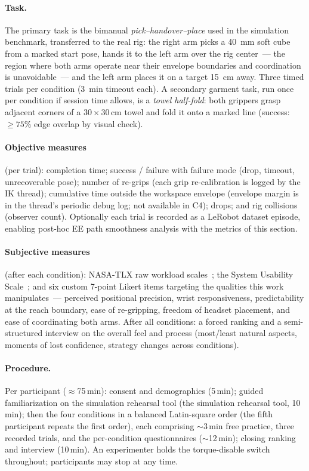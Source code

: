 \paragraph{Task.}
The primary task is the bimanual \emph{pick--handover--place} used in the
simulation benchmark, transferred to the real rig: the right arm picks a
\SI{40}{mm} soft cube from a marked start pose, hands it to the left arm
over the rig center~--- the region where both arms operate near their
envelope boundaries and coordination is unavoidable~--- and the left arm
places it on a target \SI{15}{cm} away. Three timed trials per condition
(\SI{3}{min} timeout each). A secondary garment task, run once per
condition if session time allows, is a \emph{towel half-fold}: both
grippers grasp adjacent corners of a \(30\times30\)\,cm towel and fold it
onto a marked line (success: \(\ge75\%\) edge overlap by visual check).

\paragraph{Objective measures} (per trial): completion time; success /
failure with failure mode (drop, timeout, unrecoverable pose); number of
re-grips (each grip re-calibration is logged by the IK thread); cumulative
time outside the workspace envelope (envelope margin is in the thread's
periodic debug log; not available in C4); drops; and rig collisions
(observer count). Optionally each trial is recorded as a LeRobot dataset
episode, enabling post-hoc EE path smoothness analysis with the metrics of
this section.

\paragraph{Subjective measures} (after each condition): NASA-TLX raw
workload scales~\citep{nasatlx}; the System Usability
Scale~\citep{sus}; and six custom 7-point Likert items targeting the
qualities this work manipulates~--- perceived positional precision, wrist
responsiveness, predictability at the reach boundary, ease of re-gripping,
freedom of headset placement, and ease of coordinating both arms. After
all conditions: a forced ranking and a semi-structured interview on the
overall feel and process (most/least natural aspects, moments of lost
confidence, strategy changes across conditions).

\paragraph{Procedure.}
Per participant (\(\approx\)75\,min): consent and demographics
(5\,min); guided familiarization on the simulation rehearsal tool
(the simulation rehearsal tool, 10\,min); then the four conditions in a
balanced Latin-square order (the fifth participant repeats the first
order), each comprising \(\sim\)3\,min free practice, three recorded
trials, and the per-condition questionnaires (\(\sim\)12\,min); closing
ranking and interview (10\,min). An experimenter holds the
torque-disable switch throughout; participants may stop at any time.

